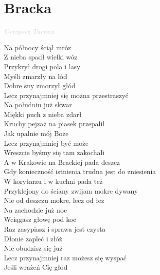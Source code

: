 \documentclass[a5paper, 10pt]{book}
\begin{document}
\section{Bracka}\textcolor{lightgray}{\textit{Grzegorz Turnau}}\vspace*{1.5mm}\\
\begin{minipage}[t]{0.8\textwidth}
  Na północy ściął mróz\\
  Z nieba spadł wielki wóz\\
  Przykrył drogi pola i lasy\\
  Myśli zmarzły na lód\\
  Dobre sny zmorzył głód\\
  Lecz przynajmniej się można przestraszyć\vspace*{2mm}\\
  Na południu już skwar\\
  Miękki puch z nieba zdarł\\
  Kruchy pejzaż na piasek przepalił\\
  Jak upalnie mój Boże\\
  Lecz przynajmniej być może\\
  Wreszcie byśmy się tam zakochali\vspace*{2mm}\\
  \hspace*{5mm}A w Krakowie na Brackiej pada deszcz\\
  \hspace*{5mm}Gdy konieczność istnienia trudna jest do zniesienia\\
  \hspace*{5mm}W korytarzu i w kuchni pada też\\
  \hspace*{5mm}Przyklejony do ściany zwijam mokre dywany\\
  \hspace*{5mm}Nie od deszczu mokre, lecz od łez\vspace*{2mm}\\
  Na zachodzie już noc\\
  Wciągasz głowę pod koc\\
  Raz zasypiasz i sprawa jest czysta\\
  Dłonie zapleć i złóż\\
  Nie obudzisz się już\\
  Lecz przynajmniej raz możesz się wyspać\vspace*{2mm}\\
  Jeśli wrażeń Cię głód\\

\end{minipage}
\end{document}
